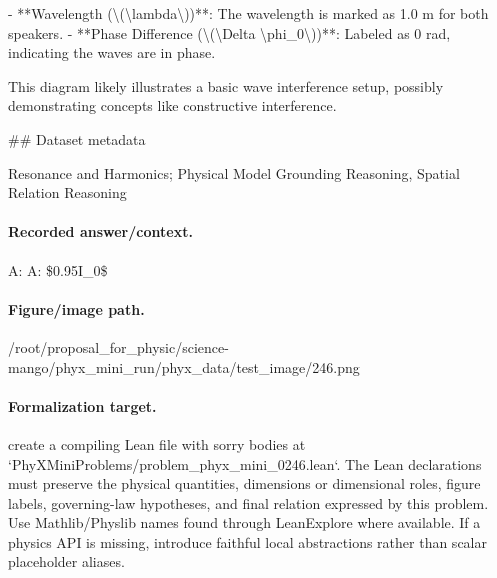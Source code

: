 - **Wavelength (\textbackslash{}(\textbackslash{}lambda\textbackslash{}))**: The wavelength is marked as 1.0 m for both speakers.
- **Phase Difference (\textbackslash{}(\textbackslash{}Delta \textbackslash{}phi\_0\textbackslash{}))**: Labeled as 0 rad, indicating the waves are in phase.

This diagram likely illustrates a basic wave interference setup, possibly demonstrating concepts like constructive interference.

\#\# Dataset metadata

Resonance and Harmonics; Physical Model Grounding Reasoning, Spatial Relation Reasoning

\paragraph{Recorded answer/context.}
A: A: \$0.95I\_0\$

\paragraph{Figure/image path.}
/root/proposal\_for\_physic/science-mango/phyx\_mini\_run/phyx\_data/test\_image/246.png

\paragraph{Formalization target.}
create a compiling Lean file with sorry bodies at `PhyXMiniProblems/problem\_phyx\_mini\_0246.lean`. The Lean declarations must preserve the physical quantities, dimensions or dimensional roles, figure labels, governing-law hypotheses, and final relation expressed by this problem.
Use Mathlib/Physlib names found through LeanExplore where available. If a physics API is missing, introduce faithful local abstractions rather than scalar placeholder aliases.

